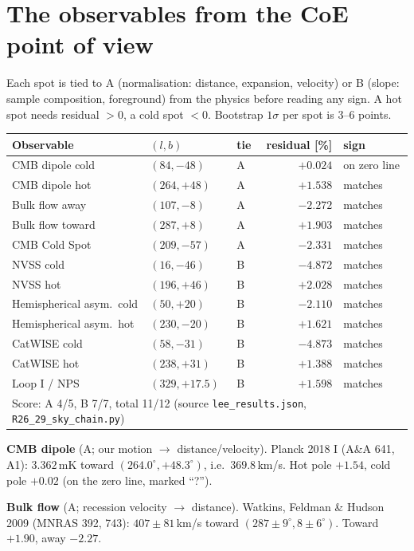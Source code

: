 \documentclass[11pt]{article}
\begin{document}
\section{The observables from the CoE point of view}
Each spot is tied to A (normalisation: distance, expansion, velocity) or B (slope: sample composition, foreground) from the physics before reading any sign. A hot spot needs residual $>0$, a cold spot $<0$. Bootstrap $1\sigma$ per spot is 3--6 points.

\begin{table}[H]\centering\small
\begin{tabular}{lllrl}\toprule
Observable & $(l,b)$ & tie & residual [\%] & sign\\\midrule
CMB dipole cold & $(84,-48)$ & A & $+0.024$ & on zero line\\
CMB dipole hot & $(264,+48)$ & A & $+1.538$ & matches\\
Bulk flow away & $(107,-8)$ & A & $-2.272$ & matches\\
Bulk flow toward & $(287,+8)$ & A & $+1.903$ & matches\\
CMB Cold Spot & $(209,-57)$ & A & $-2.331$ & matches\\
NVSS cold & $(16,-46)$ & B & $-4.872$ & matches\\
NVSS hot & $(196,+46)$ & B & $+2.028$ & matches\\
Hemispherical asym.\ cold & $(50,+20)$ & B & $-2.110$ & matches\\
Hemispherical asym.\ hot & $(230,-20)$ & B & $+1.621$ & matches\\
CatWISE cold & $(58,-31)$ & B & $-4.873$ & matches\\
CatWISE hot & $(238,+31)$ & B & $+1.388$ & matches\\
Loop I / NPS & $(329,+17.5)$ & B & $+1.598$ & matches\\\midrule
\multicolumn{5}{l}{Score: A 4/5, B 7/7, total 11/12 (source \texttt{lee\_results.json}, \texttt{R26\_29\_sky\_chain.py})}\\\bottomrule
\end{tabular}\end{table}

\textbf{CMB dipole} (A; our motion $\to$ distance/velocity). Planck 2018 I (A\&A 641, A1): $3.362$\,mK toward $(264.0^\circ,+48.3^\circ)$, i.e.\ $369.8$\,km/s. Hot pole $+1.54$, cold pole $+0.02$ (on the zero line, marked ``?'').

\textbf{Bulk flow} (A; recession velocity $\to$ distance). Watkins, Feldman \& Hudson 2009 (MNRAS 392, 743): $407\pm81$\,km/s toward $(287\pm9^\circ, 8\pm6^\circ)$. Toward $+1.90$, away $-2.27$.
\end{document}
